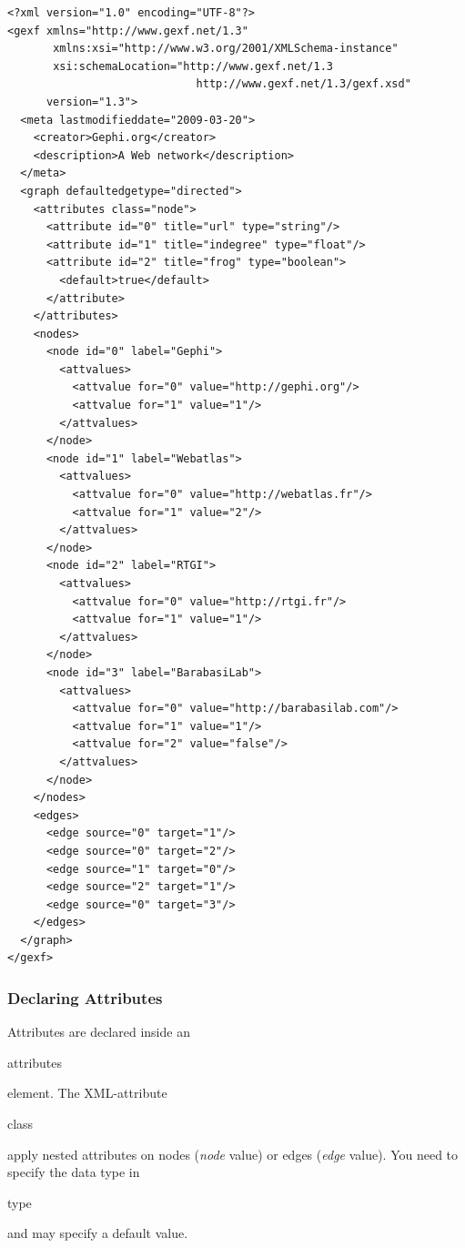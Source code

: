 \documentclass[a4paper,10pt]{article}
\begin{document}
\lstset{ style=gexf }
\begin{lstlisting}[caption={A (small) Web Graph},label=webgraph]
<?xml version="1.0" encoding="UTF-8"?>
<gexf xmlns="http://www.gexf.net/1.3"
       xmlns:xsi="http://www.w3.org/2001/XMLSchema-instance"
       xsi:schemaLocation="http://www.gexf.net/1.3
                             http://www.gexf.net/1.3/gexf.xsd"
      version="1.3">
  <meta lastmodifieddate="2009-03-20">
    <creator>Gephi.org</creator>
    <description>A Web network</description>
  </meta>
  <graph defaultedgetype="directed">
    <attributes class="node">
      <attribute id="0" title="url" type="string"/>
      <attribute id="1" title="indegree" type="float"/>
      <attribute id="2" title="frog" type="boolean">
        <default>true</default>
      </attribute>
    </attributes>
    <nodes>
      <node id="0" label="Gephi">
        <attvalues>
          <attvalue for="0" value="http://gephi.org"/>
          <attvalue for="1" value="1"/>
        </attvalues>
      </node>
      <node id="1" label="Webatlas">
        <attvalues>
          <attvalue for="0" value="http://webatlas.fr"/>
          <attvalue for="1" value="2"/>
        </attvalues>
      </node>
      <node id="2" label="RTGI">
        <attvalues>
          <attvalue for="0" value="http://rtgi.fr"/>
          <attvalue for="1" value="1"/>
        </attvalues>
      </node>
      <node id="3" label="BarabasiLab">
        <attvalues>
          <attvalue for="0" value="http://barabasilab.com"/>
          <attvalue for="1" value="1"/>
          <attvalue for="2" value="false"/>
        </attvalues>
      </node>
    </nodes>
    <edges>
      <edge source="0" target="1"/>
      <edge source="0" target="2"/>
      <edge source="1" target="0"/>
      <edge source="2" target="1"/>
      <edge source="0" target="3"/>
    </edges>
  </graph>
</gexf>
\end{lstlisting}


\subsubsection{Declaring Attributes}

Attributes are declared inside an \begin{footnotesize}attributes\end{footnotesize} element. The XML-attribute \begin{footnotesize}class\end{footnotesize} apply nested attributes on nodes (\textit{node} value) or edges (\textit{edge} value). You need to specify the data type in \begin{footnotesize}type\end{footnotesize} and may specify a default value.
\end{document}
